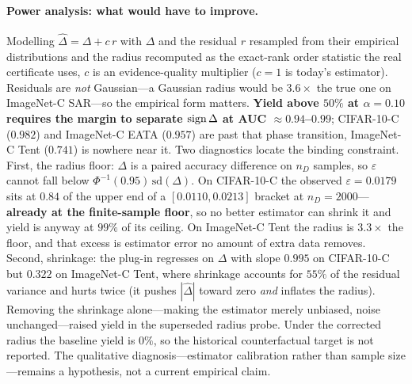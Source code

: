 \paragraph{Power analysis: what would have to improve.} Modelling
$\widehat\Delta=\Delta+c\,r$ with $\Delta$ and the residual $r$ resampled from their empirical
distributions and the radius recomputed as the exact-rank order statistic the real certificate uses,
$c$ is an evidence-quality multiplier ($c{=}1$ is today's estimator). Residuals are \emph{not}
Gaussian---a Gaussian radius would be $3.6\times$ the true one on ImageNet-C SAR---so the empirical
form matters. \textbf{Yield above $50\%$ at $\alpha{=}0.10$ requires the margin to separate
$\operatorname{sign}\Delta$ at AUC $\approx0.94$--$0.99$}; CIFAR-10-C ($0.982$) and ImageNet-C EATA ($0.957$) are
past that phase transition, ImageNet-C Tent ($0.741$) is nowhere near it. Two diagnostics locate the
binding constraint. First, the radius floor: $\Delta$ is a paired accuracy difference on $n_D$
samples, so $\varepsilon$ cannot fall below $\Phi^{-1}(0.95)\,\mathrm{sd}(\Delta)$. On CIFAR-10-C
the observed $\varepsilon=0.0179$ sits at $0.84$ of the upper end of a $[0.0110,0.0213]$ bracket at
$n_D{=}2000$---\textbf{already at the finite-sample floor}, so no better estimator can shrink it and
yield is anyway at $99\%$ of its ceiling. On ImageNet-C Tent the radius is $3.3\times$ the floor, and
that excess is estimator error no amount of extra data removes. Second, shrinkage: the plug-in
regresses on $\Delta$ with slope $0.995$ on CIFAR-10-C but $0.322$ on ImageNet-C Tent, where
shrinkage accounts for $55\%$ of the residual variance and hurts twice (it pushes
$|\widehat\Delta|$ toward zero \emph{and} inflates the radius). Removing the shrinkage
alone---making the estimator merely unbiased, noise unchanged---raised yield in the superseded
radius probe. Under the corrected radius the baseline yield is $0\%$, so the historical
counterfactual target is not reported. The qualitative diagnosis---estimator
calibration rather than sample size---remains a hypothesis, not a current empirical claim.

\fi
